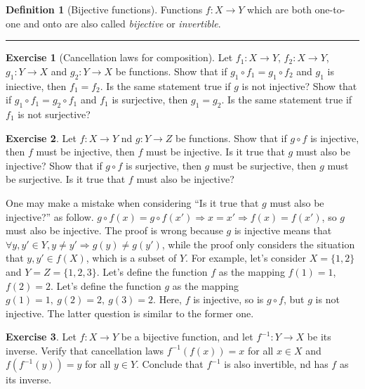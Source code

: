 \documentclass[
]{book}
\theoremstyle{definition}
\newtheorem{definition}{Definition}[chapter]
\theoremstyle{definition}
\theoremstyle{definition}
\newtheorem{exercise}{Exercise}[chapter]
\theoremstyle{definition}
\theoremstyle{remark}
\begin{document}
\begin{definition}[Bijective functions]
\protect\hypertarget{def:bj}{}\label{def:bj}Functions \(f:X\to Y\) which are both one-to-one and onto are also called \emph{bijective} or \emph{invertible}.
\end{definition}

\begin{center}\rule{0.5\linewidth}{0.5pt}\end{center}

\begin{exercise}[Cancellation laws for composition]
Let \(f_1: X\to Y\), \(f_2: X\to Y\), \(g_1:Y \to X\) and \(g_2:Y \to X\) be functions. Show that if \(g_1\circ f_1 = g_1\circ f_2\) and \(g_1\) is iniective, then \(f_1=f_2\). Is the same statement true if \(g\) is not injective? Show that if \(g_1\circ f_1 = g_2\circ f_1\) and \(f_1\) is surjective, then \(g_1=g_2\). Is the same statement true if \(f_1\) is not surjective?
\end{exercise}

\begin{exercise}
Let \(f:X\to Y\) nd \(g:Y\to Z\) be functions. Show that if \(g\circ f\) is injective, then \(f\) must be injective, then \(f\) must be injective. Is it true that \(g\) must also be injective? Show that if \(g\circ f\) is surjective, then \(g\) must be surjective, then \(g\) must be surjective. Is it true that \(f\) must also be injective?
\end{exercise}

One may make a mistake when considering ``Is it true that \(g\) must also be injective?'' as follow. \(g\circ f (x) = g\circ f(x') \Longrightarrow x=x' \Longrightarrow f(x) = f(x')\), so \(g\) must also be injective. The proof is wrong because \(g\) is injective means that \(\forall y,y'\in Y, y\ne y' \Longrightarrow g(y)\ne g(y')\), while the proof only considers the situation that \(y,y' \in f(X)\), which is a subset of \(Y\). For example, let's consider \(X = \{1,2\}\) and \(Y=Z=\{1,2,3\}\). Let's define the function \(f\) as the mapping \(f(1)=1\), \(f(2)=2\). Let's define the function \(g\) as the mapping \(g(1) = 1,\ g(2)=2,\ g(3)=2\). Here, \(f\) is injective, so is \(g\circ f\), but \(g\) is not injective. The latter question is similar to the former one.

\begin{exercise}
Let \(f:X\to Y\) be a bijective function, and let \(f^{-1}:Y\to X\) be its inverse. Verify that cancellation laws \(f^{-1}(f(x)) = x\) for all \(x\in X\) and \(f(f^{-1}(y))=y\) for all \(y\in Y\). Conclude that \(f^{-1}\) is also invertible, nd has \(f\) as its inverse.
\end{exercise}
\end{document}
